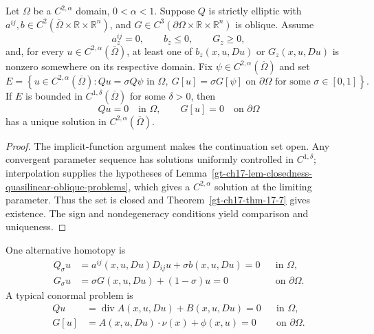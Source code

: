 \begin{theorem}
\label{gt-ch17-thm-quasilinear-oblique-solvability-c1delta}
Let $\Omega$ be a $C^{2,\alpha}$ domain, $0<\alpha<1$.  Suppose $Q$ is
strictly elliptic with $a^{ij},b\in C^2(\overline\Omega\times\mathbb R
\times\mathbb R^n)$, and
$G\in C^3(\partial\Omega\times\mathbb R\times\mathbb R^n)$ is oblique.
Assume
\[
a^{ij}_z=0,
\qquad b_z\le0,
\qquad G_z\ge0,
\]
and, for every $u\in C^{2,\alpha}(\overline\Omega)$, at least one of
$b_z(x,u,Du)$ or $G_z(x,u,Du)$ is nonzero somewhere on its respective
domain.  Fix $\psi\in C^{2,\alpha}(\overline\Omega)$ and set
\begin{equation}\tag{17.109}
E=\left\{u\in C^{2,\alpha}(\overline\Omega):
Qu=\sigma Q\psi\text{ in }\Omega,
\ G[u]=\sigma G[\psi]\text{ on }\partial\Omega
\text{ for some }\sigma\in[0,1]\right\}.
\end{equation}
If $E$ is bounded in $C^{1,\delta}(\overline\Omega)$ for some $\delta>0$,
then
\[
Qu=0\quad\text{in }\Omega,
\qquad G[u]=0\quad\text{on }\partial\Omega
\]
has a unique solution in $C^{2,\alpha}(\overline\Omega)$.
\end{theorem}
\begin{proof}
\sketch The implicit-function argument makes the continuation set open.
Any convergent parameter sequence has solutions uniformly controlled in
$C^{1,\delta}$; interpolation supplies the hypotheses of
Lemma~\ref{gt-ch17-lem-closedness-quasilinear-oblique-problems}, which
gives a $C^{2,\alpha}$ solution at the limiting parameter.  Thus the set is
closed and Theorem~\ref{gt-ch17-thm-17-7} gives existence.  The sign and
nondegeneracy
conditions yield comparison and uniqueness.
\end{proof}

One alternative homotopy is
\begin{equation}
\tag{17.110}
\begin{aligned}
Q_\sigma u&=a^{ij}(x,u,Du)D_{ij}u+\sigma b(x,u,Du)=0
&&\text{in }\Omega,\\
G_\sigma u&=\sigma G(x,u,Du)+(1-\sigma)u=0
&&\text{on }\partial\Omega.
\end{aligned}
\end{equation}
A typical conormal problem is
\begin{equation}
\tag{17.111}
\begin{aligned}
Qu&=\operatorname{div}A(x,u,Du)+B(x,u,Du)=0
&&\text{in }\Omega,\\
G[u]&=A(x,u,Du)\cdot\nu(x)+\phi(x,u)=0
&&\text{on }\partial\Omega.
\end{aligned}
\end{equation}
